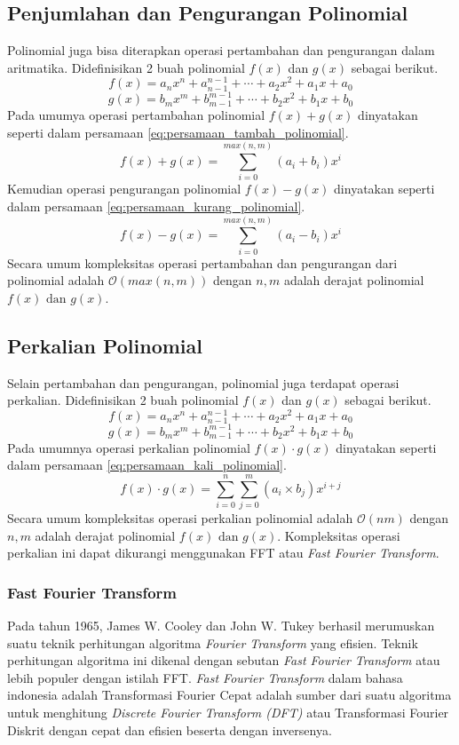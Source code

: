 \subsection{ Penjumlahan dan Pengurangan Polinomial}
Polinomial juga bisa diterapkan operasi pertambahan dan pengurangan dalam aritmatika. 
Didefinisikan 2 buah polinomial $f(x)$ dan $g(x)$ sebagai berikut.
$$ f(x) = a_n x^n + a_{n-1}^{n-1} + \cdots + a_2x^2 + a_1x + a_0 $$
$$ g(x) = b_m x^m + b_{m-1}^{m-1} + \cdots + b_2x^2 + b_1x + b_0 $$
Pada umumya operasi pertambahan polinomial $ f(x) + g(x) $ dinyatakan seperti dalam persamaan \eqref{eq:persamaan_tambah_polinomial}.
\begin{equation}
	f(x) + g(x) = \sum_{i=0}^{max(n,m)} (a_i + b_i) x^i
	\label{eq:persamaan_tambah_polinomial} 
\end{equation}
Kemudian operasi pengurangan polinomial $ f(x) - g(x) $ dinyatakan seperti dalam persamaan \eqref{eq:persamaan_kurang_polinomial}.
\begin{equation}
	f(x) - g(x) = \sum_{i=0}^{max(n,m)} (a_i - b_i) x^i
	\label{eq:persamaan_kurang_polinomial} 
\end{equation}
Secara umum kompleksitas operasi pertambahan dan pengurangan dari polinomial adalah $ \mathcal{O}{(max(n,m))} $ dengan $ n , m $ adalah derajat polinomial $ f(x) \text{ dan } g(x) $.

\subsection{ Perkalian Polinomial}
Selain pertambahan dan pengurangan, polinomial juga terdapat operasi perkalian.
Didefinisikan 2 buah polinomial $f(x)$ dan $g(x)$ sebagai berikut.
$$ f(x) = a_n x^n + a_{n-1}^{n-1} + \cdots + a_2x^2 + a_1x + a_0 $$
$$ g(x) = b_m x^m + b_{m-1}^{m-1} + \cdots + b_2x^2 + b_1x + b_0 $$
Pada umumnya operasi perkalian polinomial $ f(x) \cdot g(x) $ dinyatakan seperti dalam persamaan \eqref{eq:persamaan_kali_polinomial}.
\begin{equation}
	f(x) \cdot g(x) = \sum_{i=0}^{n} \sum_{j=0}^{m} (a_i \times b_j) x^{i+j}
	\label{eq:persamaan_kali_polinomial}
\end{equation}
Secara umum kompleksitas operasi perkalian polinomial adalah $ \mathcal{O}{(nm)} $ dengan $ n , m $ adalah derajat polinomial $ f(x) \text{ dan } g(x) $. Kompleksitas operasi perkalian ini dapat dikurangi menggunakan FFT atau \textit{Fast Fourier Transform}.

\subsubsection{ Fast Fourier Transform}
Pada tahun 1965, James W. Cooley dan John W. Tukey berhasil merumuskan suatu teknik perhitungan algoritma \textit{Fourier Transform} yang efisien\cite{fft}. Teknik perhitungan algoritma ini dikenal dengan sebutan \textit{Fast Fourier Transform} atau lebih populer dengan istilah FFT. \textit{Fast Fourier Transform} dalam bahasa indonesia adalah Transformasi Fourier Cepat adalah sumber dari suatu algoritma untuk menghitung \textit{Discrete Fourier Transform (DFT)} atau Transformasi Fourier Diskrit dengan cepat dan efisien beserta dengan inversenya.

